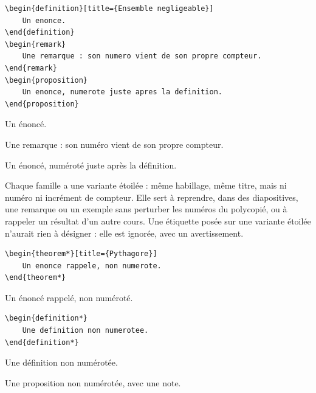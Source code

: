 \begin{lstlisting}
\begin{definition}[title={Ensemble negligeable}]
    Un enonce.
\end{definition}
\begin{remark}
    Une remarque : son numero vient de son propre compteur.
\end{remark}
\begin{proposition}
    Un enonce, numerote juste apres la definition.
\end{proposition}
\end{lstlisting}
\begin{definition}[title={Ensemble négligeable}]
    Un énoncé.
\end{definition}
\begin{remark}
    Une remarque : son numéro vient de son propre compteur.
\end{remark}
\begin{proposition}
    Un énoncé, numéroté juste après la définition.
\end{proposition}

Chaque famille a une variante étoilée : même habillage, même titre, mais ni
numéro ni incrément de compteur. Elle sert à reprendre, dans des diapositives,
une remarque ou un exemple sans perturber les numéros du polycopié, ou à
rappeler un résultat d'un autre cours. Une étiquette posée sur une variante
étoilée n'aurait rien à désigner : elle est ignorée, avec un avertissement.

\begin{lstlisting}
\begin{theorem*}[title={Pythagore}]
    Un enonce rappele, non numerote.
\end{theorem*}
\end{lstlisting}
\begin{theorem*}[title={Pythagore}]
    Un énoncé rappelé, non numéroté.
\end{theorem*}

\begin{lstlisting}
\begin{definition*}
    Une definition non numerotee.
\end{definition*}
\end{lstlisting}
\begin{definition*}
    Une définition non numérotée.
\end{definition*}

\begin{proposition*}[note={rappel}]
    Une proposition non numérotée, avec une note.
\end{proposition*}

